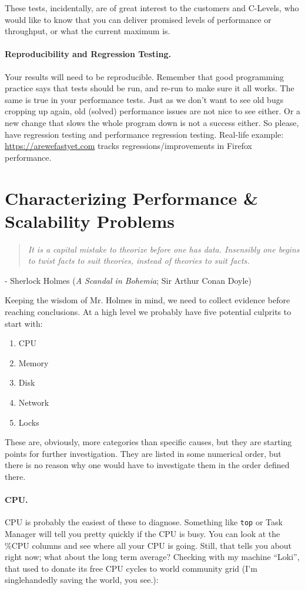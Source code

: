 \documentclass[a4paper]{report}
\begin{document}
These tests, incidentally, are of great interest to the customers and C-Levels, who would like to know that you can deliver promised levels of performance or throughput, or what the current maximum is.

\paragraph{Reproducibility and Regression Testing.}
Your results will need to be reproducible. Remember that good programming practice says that tests should be run, and re-run to make sure it all works. The same is true in your performance tests. Just as we don't want to see old bugs cropping up again, old (solved) performance issues are not nice to see either. Or a new change that slows the whole program down is not a success either. So please, have regression testing and performance regression testing. Real-life example: \url{https://arewefastyet.com} tracks regressions/improvements in Firefox performance.

\section*{Characterizing Performance \& Scalability Problems}

\begin{quote}
\textit{It is a capital mistake to theorize before one has data. Insensibly one begins to twist facts to suit theories, instead of theories to suit facts.}
\end{quote}
\hfill - Sherlock Holmes (\textit{A Scandal in Bohemia}; Sir Arthur Conan Doyle)

Keeping the wisdom of Mr. Holmes in mind, we need to collect evidence before reaching conclusions. At a high level we probably have five potential culprits to start with:
\begin{enumerate}
	\item CPU
	\item Memory
	\item Disk
	\item Network
	\item Locks
\end{enumerate}

These are, obviously, more categories than specific causes, but they are starting points for further investigation. They are listed in some numerical order, but there is no reason why one would have to investigate them in the order defined there.

\paragraph{CPU.} CPU is probably the easiest of these to diagnose. Something like \texttt{top} or Task Manager will tell you pretty quickly if the CPU is busy. You can look at the \%CPU columns and see where all your CPU is going. Still, that tells you about right now; what about the long term average? Checking with my machine ``Loki'', that used to donate its free CPU cycles to world community grid (I'm singlehandedly saving the world, you see.):
\end{document}
